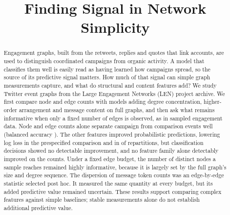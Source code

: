 \documentclass[conference]{IEEEtran}
\begin{document}
\title{Finding Signal in Network Simplicity}

\author{
}

\maketitle

\begin{abstract}
Engagement graphs, built from the retweets, replies and quotes that link accounts, are used to distinguish coordinated campaigns from organic activity. A model that classifies them well is easily read as having learned how campaigns spread, so the source of its predictive signal matters. How much of that signal can simple graph measurements capture, and what do structural and content features add? We study \RNEvents{} Twitter event graphs from the Large Engagement Networks (LEN) project archive. We first compare node and edge counts with models adding degree concentration, higher-order arrangement and message content on full graphs, and then ask what remains informative when only a fixed number of edges is observed, as in sampled engagement data. Node and edge counts alone separate campaign from comparison events well (balanced accuracy \RCountsBA). The other features improved probabilistic predictions, lowering log loss in the prespecified comparison and in \RTwCOneFav{} of \RNPartitions{} repartitions, but classification decisions showed no detectable improvement, and no feature family alone detectably improved on the counts. Under a fixed edge budget, the number of distinct nodes a sample reaches remained highly informative, because it is largely set by the full graph's size and degree sequence. The dispersion of message token counts was an edge-by-edge statistic selected post hoc. It measured the same quantity at every budget, but its added predictive value remained uncertain. These results support comparing complex features against simple baselines; stable measurements alone do not establish additional predictive value.
\end{abstract}
\end{document}
